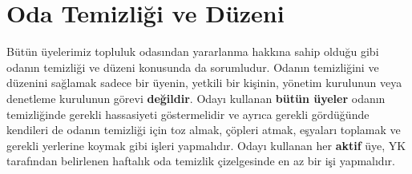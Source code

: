 \documentclass{article}
\begin{document}
\section{Oda Temizliği ve Düzeni}
\hspace{5mm}Bütün üyelerimiz topluluk odasından yararlanma hakkına sahip olduğu gibi odanın temizliği ve düzeni konusunda da sorumludur. Odanın temizliğini ve düzenini sağlamak sadece bir üyenin, yetkili bir kişinin, yönetim kurulunun veya denetleme kurulunun görevi \textbf{değildir}. Odayı kullanan \textbf{bütün üyeler} odanın temizliğinde gerekli hassasiyeti göstermelidir ve ayrıca gerekli gördüğünde kendileri de odanın temizliği için toz almak, çöpleri atmak, eşyaları toplamak ve gerekli yerlerine koymak gibi işleri yapmalıdır. Odayı kullanan her \textbf{aktif} üye, YK tarafından belirlenen haftalık oda temizlik çizelgesinde en az bir işi yapmalıdır.
\end{document}
